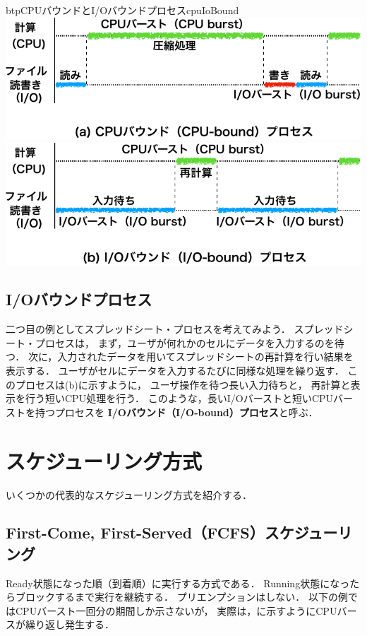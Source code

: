 \begin{myfig}{btp}{CPUバウンドとI/Oバウンドプロセス}{cpuIoBound}
\includegraphics[scale=0.66]{Fig/cpuBound-crop.pdf}
\vspace{0.8cm}
\includegraphics[scale=0.66]{Fig/ioBound-crop.pdf}
\end{myfig}

\subsection{I/Oバウンドプロセス}
二つ目の例としてスプレッドシート・プロセスを考えてみよう．
スプレッドシート・プロセスは，
まず，ユーザが何れかのセルにデータを入力するのを待つ．
次に，入力されたデータを用いてスプレッドシートの再計算を行い結果を表示する．
ユーザがセルにデータを入力するたびに同様な処理を繰り返す．
このプロセスは(b)に示すように，
ユーザ操作を待つ長い入力待ちと，
再計算と表示を行う短いCPU処理を行う．
このような，長いI/Oバーストと短いCPUバーストを持つプロセスを
{\bf I/Oバウンド（I/O-bound）プロセス}と呼ぶ．

\section{スケジューリング方式}
いくつかの代表的なスケジューリング方式を紹介する．

\subsection{First-Come, First-Served（FCFS）スケジューリング}
Ready状態になった順（到着順）に実行する方式である．
Running状態になったらブロックするまで実行を継続する．
プリエンプションはしない．
以下の例ではCPUバースト一回分の期間しか示さないが，
実際は，に示すようにCPUバースが繰り返し発生する．

